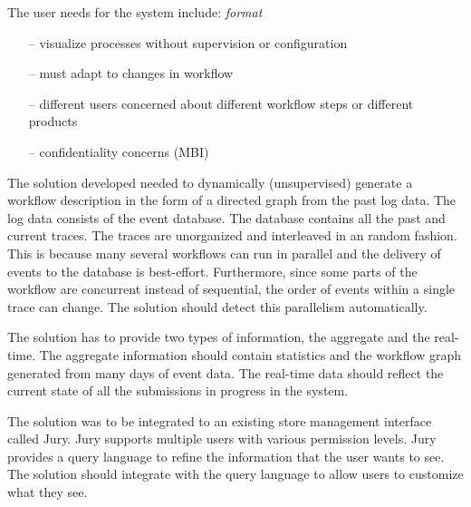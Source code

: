 \documentclass[english,12pt,a4paper,pdftex,sci,utf8]{aaltothesis}
\newcommand{\nyi}[1]{\colorbox{nyibg}{\textcolor{nyitext}{\emph{#1}}}}
\begin{document}
The user needs for the system include: \nyi{format}
\begin{itemize}
\item[--]visualize processes without supervision or configuration
\item[--]must adapt to changes in workflow
\item[--]different users concerned about different workflow steps or different products
\item[--]confidentiality concerns (MBI)
\end{itemize}

The solution developed needed to dynamically (unsupervised) generate a workflow description in the form of a directed graph
from the past log data. The log data consists of the event database. The database contains all the 
past and current traces. The traces are unorganized and interleaved in an random fashion. This is because many several
workflows can run in parallel and the delivery of events to the database is best-effort. Furthermore, since some parts of the workflow are concurrent instead of sequential, the order of events within a single trace can change. 
The solution should detect this parallelism automatically.

The solution has to provide two types of information, the aggregate and the real-time. 
The aggregate information should contain statistics and the workflow graph generated from many days of event data.
The real-time data should reflect the current state of all the submissions in progress in the system.

The solution was to be integrated to an existing store management interface called Jury. 
Jury supports multiple users with various permission levels. Jury provides a query language to refine the information
that the user wants to see. The solution should integrate with the query language to allow users to customize 
what they see.

\end{document}
